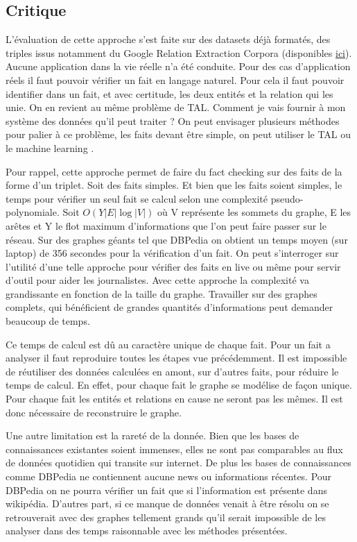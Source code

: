 \subsection{Critique}

L'évaluation de cette approche s'est faite sur des datasets déjà formatés, des triples issus notamment du Google Relation Extraction Corpora
(disponibles \href{https://github.com/google-research-datasets/relation-extraction-corpus}{ici}). Aucune application dans la vie réelle n'a été conduite. Pour des cas d'application réels il faut pouvoir vérifier un fait en langage naturel. Pour cela il faut pouvoir identifier dans un fait, et avec certitude, les deux entités et la relation qui les unie. On en revient au même problème de TAL. Comment je vais fournir à mon système des données qu'il peut traiter ? On peut envisager plusieurs méthodes pour palier à ce problème, les faits devant être simple, on peut utiliser le TAL ou le machine learning \cite{googleai}. 

Pour rappel, cette approche permet de faire du fact checking sur des faits de la forme d'un triplet. Soit des faits simples. Et bien que les faits soient simples, le temps pour vérifier un seul fait se calcul selon une complexité pseudo-polynomiale. Soit $ O(Y|E|\log |V|)$ où V représente les sommets du graphe, E les arêtes et Y le flot maximum d'informations que l'on peut faire passer sur le réseau. Sur des graphes géants tel que DBPedia on obtient un temps moyen (sur laptop) de 356 secondes pour la vérification d'un fait. On peut s'interroger sur l'utilité d'une telle approche pour vérifier des faits en live ou même pour servir d'outil pour aider les journalistes. Avec cette approche la complexité va grandissante en fonction de la taille du graphe. Travailler sur des graphes complets, qui bénéficient de grandes quantités d'informations peut demander beaucoup de temps.

Ce temps de calcul est dû au caractère unique de chaque fait. Pour un fait a analyser il faut reproduire toutes les étapes vue précédemment. Il est impossible de réutiliser des données calculées en amont, sur d'autres faits, pour réduire le temps de calcul. En effet, pour chaque fait le graphe se modélise de façon unique. Pour chaque fait les entités et relations en cause ne seront pas les mêmes. Il est donc nécessaire de reconstruire le graphe.

Une autre limitation est la rareté de la donnée. Bien que les bases de connaissances existantes soient immenses, elles ne sont pas comparables au flux de données quotidien qui transite sur internet. De plus les bases de connaissances comme DBPedia ne contiennent aucune news ou informations récentes. Pour DBPedia on ne pourra vérifier un fait que si l'information est présente dans wikipédia. D'autres part, si ce manque de données venait à être résolu on se retrouverait avec des graphes tellement grands qu'il serait impossible de les analyser dans des temps raisonnable avec les méthodes présentées.

